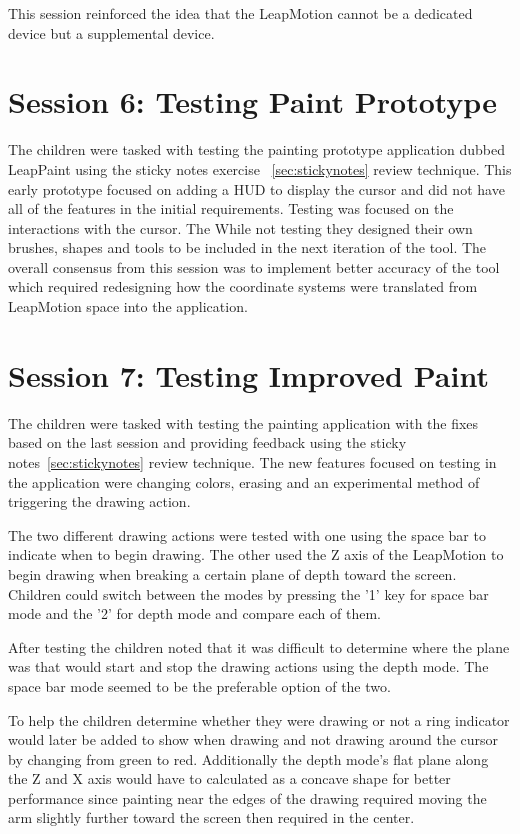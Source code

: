 This session reinforced the idea that the LeapMotion cannot be a dedicated device but a supplemental device.

\section{Session 6: Testing Paint Prototype}\label{session6}


The children were tasked with testing the painting prototype application dubbed LeapPaint using the sticky notes exercise ~\ref{sec:stickynotes} review technique. This early prototype focused on adding a HUD to display the cursor and did not have all of the features in the initial requirements. Testing was focused on the interactions with the cursor. The While not testing they designed their own brushes, shapes and tools to be included in the next iteration of the tool. The overall consensus from this session was to implement better accuracy of the tool which required redesigning how the coordinate systems were translated from LeapMotion space into the application. 


\section{Session 7: Testing Improved Paint}\label{session7}


The children were tasked with testing the painting application with the fixes based on the last session and providing feedback using the sticky notes~\ref{sec:stickynotes} review technique. The new features focused on testing in the application were changing colors, erasing and an experimental method of triggering the drawing action. 

The two different drawing actions were tested with one using the space bar to indicate when to begin drawing. The other used the Z axis of the LeapMotion to begin drawing when breaking a certain plane of depth toward the screen. Children could switch between the modes by pressing the '1' key for space bar mode and the '2' for depth mode and compare each of them.

After testing the children noted that it was difficult to determine where the plane was that would start and stop the drawing actions using the depth mode. The space bar mode seemed to be the preferable option of the two. 

To help the children determine whether they were drawing or not a ring indicator would later be added to show when drawing and not drawing around the cursor by changing from green to red. Additionally the depth mode's flat plane along the Z and X axis would have to calculated as a concave shape for better performance since painting near the edges of the drawing required moving the arm slightly further toward the screen then required in the center. 



